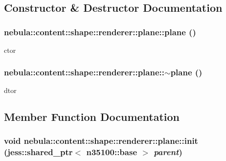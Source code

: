\subsection{Constructor \& Destructor Documentation}
\hypertarget{classnebula_1_1content_1_1shape_1_1renderer_1_1plane_a4294d287f8de066619bd95c08a20aa8a}{
\subsubsection[{plane}]{\setlength{\rightskip}{0pt plus 5cm}nebula::content::shape::renderer::plane::plane ()}}
\label{classnebula_1_1content_1_1shape_1_1renderer_1_1plane_a4294d287f8de066619bd95c08a20aa8a}


ctor \hypertarget{classnebula_1_1content_1_1shape_1_1renderer_1_1plane_a7b467011f296865587b149b629c3b5e6}{
\subsubsection[{$\sim$plane}]{\setlength{\rightskip}{0pt plus 5cm}nebula::content::shape::renderer::plane::$\sim$plane ()}}
\label{classnebula_1_1content_1_1shape_1_1renderer_1_1plane_a7b467011f296865587b149b629c3b5e6}


dtor 

\subsection{Member Function Documentation}
\hypertarget{classnebula_1_1content_1_1shape_1_1renderer_1_1plane_a145d3d5df479fd13eb58332b1c5e4a72}{
\subsubsection[{init}]{\setlength{\rightskip}{0pt plus 5cm}void nebula::content::shape::renderer::plane::init (jess::shared\_\-ptr$<$ {\bf n35100::base} $>$ {\em parent})}}
\label{classnebula_1_1content_1_1shape_1_1renderer_1_1plane_a145d3d5df479fd13eb58332b1c5e4a72}


